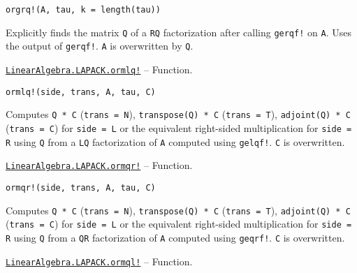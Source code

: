 \begin{adjustwidth}{2em}{0pt}


\begin{verbatim}
orgrq!(A, tau, k = length(tau))
\end{verbatim}

Explicitly finds the matrix \texttt{Q} of a \texttt{RQ} factorization after calling \texttt{gerqf!} on \texttt{A}. Uses the output of \texttt{gerqf!}. \texttt{A} is overwritten by \texttt{Q}.



\end{adjustwidth}
\hypertarget{6791415432360539771}{} 
\hyperlink{6791415432360539771}{\texttt{LinearAlgebra.LAPACK.ormlq!}}  -- {Function.}

\begin{adjustwidth}{2em}{0pt}


\begin{verbatim}
ormlq!(side, trans, A, tau, C)
\end{verbatim}

Computes \texttt{Q * C} (\texttt{trans = N}), \texttt{transpose(Q) * C} (\texttt{trans = T}), \texttt{adjoint(Q) * C} (\texttt{trans = C}) for \texttt{side = L} or the equivalent right-sided multiplication for \texttt{side = R} using \texttt{Q} from a \texttt{LQ} factorization of \texttt{A} computed using \texttt{gelqf!}. \texttt{C} is overwritten.



\end{adjustwidth}
\hypertarget{4642443581739897648}{} 
\hyperlink{4642443581739897648}{\texttt{LinearAlgebra.LAPACK.ormqr!}}  -- {Function.}

\begin{adjustwidth}{2em}{0pt}


\begin{verbatim}
ormqr!(side, trans, A, tau, C)
\end{verbatim}

Computes \texttt{Q * C} (\texttt{trans = N}), \texttt{transpose(Q) * C} (\texttt{trans = T}), \texttt{adjoint(Q) * C} (\texttt{trans = C}) for \texttt{side = L} or the equivalent right-sided multiplication for \texttt{side = R} using \texttt{Q} from a \texttt{QR} factorization of \texttt{A} computed using \texttt{geqrf!}. \texttt{C} is overwritten.



\end{adjustwidth}
\hypertarget{8769001276299575898}{} 
\hyperlink{8769001276299575898}{\texttt{LinearAlgebra.LAPACK.ormql!}}  -- {Function.}

